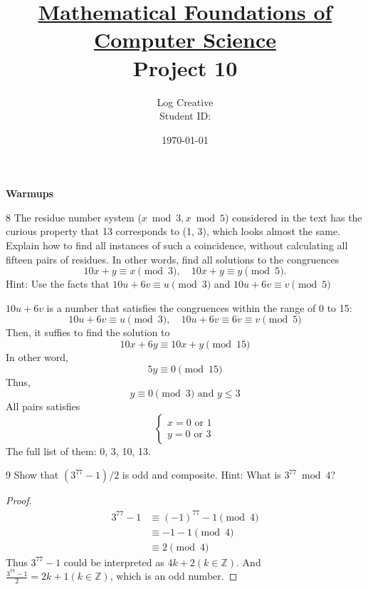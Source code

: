\documentclass[a4paper,12pt]{article}
\title{\small \underline{Mathematical Foundations of Computer Science}\\\Large Project 10}
\author{Log Creative\\\small Student ID: }
\date{\today}
\makeatletter
\newtheorem*{solution}{Solution}
\theoremstyle{definition}
\renewenvironment{solution}[1][Solution] {\par\pushQED{\qed}\normalfont\topsep6\p@\@plus6\p@\relax\trivlist\item[\hskip\labelsep\bfseries#1\@addpunct{.}]\ignorespaces}{\popQED\endtrivlist\@endpefalse} \makeatother
\newenvironment{problems}{\begin{list}{}{\renewcommand{\makelabel}[1]{\textbf{##1}\hfil}}}{\end{list}}
\makeatother
\begin{document}
\maketitle

\noindent\textbf{Warmups}

\begin{problems}
    \item[8]The residue number system  ($x\bmod 3, x \bmod 5$) considered in the text has the curious property that 13 corresponds to (1, 3), which looks almost the same.  Explain how to find all instances of such a coincidence, without calculating all fifteen pairs of residues.  In other words, find all solutions to the congruences
    \begin{equation*}
        10x+y\equiv x\pmod 3,\quad 10x+y \equiv y\pmod 5.    
    \end{equation*}
    Hint: Use the facts that $10u+6v\equiv u\pmod 3$ and $10u+6v\equiv v\pmod 5$
    \begin{solution}
        $10u+6v$ is a number that satisfies the congruences within the range of 0 to 15:
        \begin{equation*}
            10u+6v\equiv u \pmod 3, \quad 10u+6v\equiv 6v \equiv v \pmod 5
        \end{equation*}
        Then, it suffies to find the solution to
        \begin{equation*}
            10x+6y\equiv 10x+y \pmod{15}
        \end{equation*}
        In other word,
        \begin{equation*}
            5y\equiv 0 \pmod{15}
        \end{equation*}
        Thus,
        \begin{equation*}
            y\equiv 0\pmod{3} \text{ and } y\leq 3
        \end{equation*}
        All pairs satisfies
        \begin{equation*}
            \begin{cases}
                x=0\text{ or }1\\
                y=0\text{ or }3
            \end{cases}
        \end{equation*}
        The full list of them: 0, 3, 10, 13.
    \end{solution}

    \item[9] Show that $(3^{77}-1)/2$ is odd and composite. Hint: What is $3^{77}\bmod 4$?
    \begin{proof}
        \begin{align*}
            3^{77} - 1&\equiv (-1)^{77} - 1 \pmod 4\\
                &\equiv -1 - 1\pmod 4\\
                &\equiv 2 \pmod 4
        \end{align*}
        Thus $3^{77}-1$ could be interpreted as $4k+2(k\in\mathbb{Z})$. And $\frac{3^{77}-1}{2}=2k+1(k\in\mathbb{Z})$, which is an odd number.


\end{proof}
\end{problems}
\end{document}
